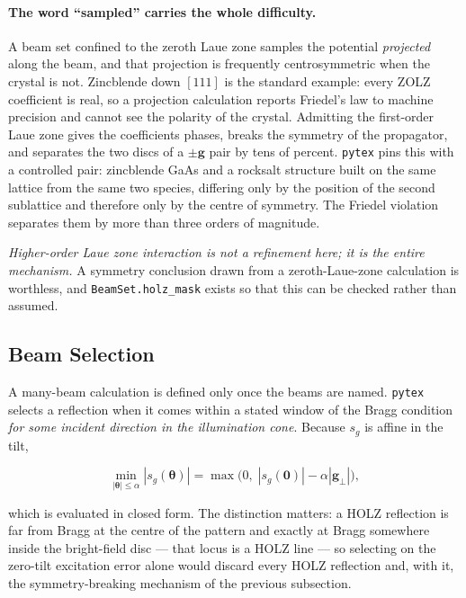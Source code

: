 \paragraph{The word ``sampled'' carries the whole difficulty.} A beam set confined to the
zeroth Laue zone samples the potential \emph{projected} along the beam, and that projection
is frequently centrosymmetric when the crystal is not. Zincblende down \([111]\) is the
standard example: every ZOLZ coefficient is real, so a projection calculation reports
Friedel's law to machine precision and cannot see the polarity of the crystal. Admitting the
first-order Laue zone gives the coefficients phases, breaks the symmetry of the propagator,
and separates the two discs of a \(\pm\mathbf{g}\) pair by tens of percent. \texttt{pytex}
pins this with a controlled pair: zincblende GaAs and a rocksalt structure built on the same
lattice from the same two species, differing only by the position of the second sublattice
and therefore only by the centre of symmetry. The Friedel violation separates them by more
than three orders of magnitude.

\emph{Higher-order Laue zone interaction is not a refinement here; it is the entire
mechanism.} A symmetry conclusion drawn from a zeroth-Laue-zone calculation is worthless, and
\texttt{BeamSet.holz\_mask} exists so that this can be checked rather than assumed.

\subsection{Beam Selection}

A many-beam calculation is defined only once the beams are named. \texttt{pytex} selects a
reflection when it comes within a stated window of the Bragg condition \emph{for some
incident direction in the illumination cone}. Because \(s_{g}\) is affine in the tilt,

\begin{equation}
  \min_{|\boldsymbol{\theta}| \le \alpha} |s_{g}(\boldsymbol{\theta})|
    = \max\bigl(0,\; |s_{g}(\mathbf{0})| - \alpha|\mathbf{g}_{\perp}|\bigr),
  \label{eq:dyn-selection}
\end{equation}

which is evaluated in closed form. The distinction matters: a HOLZ reflection is far from
Bragg at the centre of the pattern and exactly at Bragg somewhere inside the bright-field
disc --- that locus is a HOLZ line --- so selecting on the zero-tilt excitation error alone
would discard every HOLZ reflection and, with it, the symmetry-breaking mechanism of the
previous subsection.

